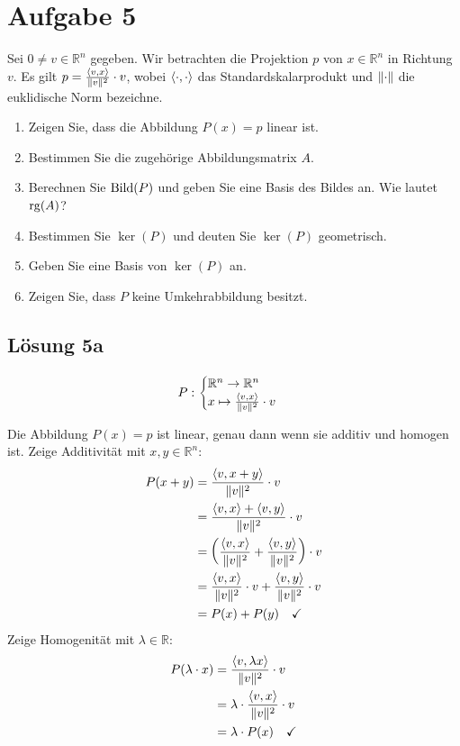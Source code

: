 \documentclass[main.tex]{subfiles}
\begin{document}
\section{Aufgabe 5}
Sei $0 \neq v \in \mathbb{R}^n$ gegeben. Wir betrachten die Projektion $p$ von $x\in \mathbb{R}^n$ in Richtung $v$. Es gilt $p=\frac{\langle v,x\rangle}{\lVert v\rVert^2} \cdot v$, wobei $\langle\cdot, \cdot\rangle$ das Standardskalarprodukt und $\lVert\cdot\rVert$ die euklidische Norm bezeichne.

\begin{enumerate}
    \item Zeigen Sie, dass die Abbildung $P(x)=p$ linear ist.
    \item Bestimmen Sie die zugehörige Abbildungsmatrix $A$.
    \item Berechnen Sie $\operatorname{Bild}(P)$ und geben Sie eine Basis des Bildes an. Wie lautet $\operatorname{rg}(A)$?
    \item Bestimmen Sie $\ker(P)$ und deuten Sie $\ker(P)$ geometrisch.
    \item Geben Sie eine Basis von $\ker(P)$ an.
    \item Zeigen Sie, dass $P$ keine Umkehrabbildung besitzt.
\end{enumerate}

\subsection{Lösung 5a}
$$
    P: \begin{cases}
        \mathbb{R}^n \to \mathbb{R}^n \\
        x \mapsto \frac{\langle v,x\rangle}{\lVert v\rVert^2} \cdot v\\
    \end{cases}
$$

Die Abbildung $P(x)=p$ ist linear, genau dann wenn sie additiv und homogen ist.
Zeige Additivität mit $x,y\in \mathbb{R}^n$:
\begin{align*}
    P(x+y) &= \frac{\langle v,x+y\rangle}{\lVert v\rVert^2} \cdot v \\
    &= \frac{\langle v,x\rangle+\langle v,y\rangle}{\lVert v\rVert^2} \cdot v \\
    &= \left(
        \frac{\langle v,x\rangle}{\lVert v\rVert^2} + \frac{\langle v,y\rangle}{\lVert v\rVert^2}
    \right) \cdot v \\
    &= \frac{\langle v,x\rangle}{\lVert v\rVert^2}\cdot v + \frac{\langle v,y\rangle}{\lVert v\rVert^2}\cdot v \\
    &= P(x) + P(y) \quad \checkmark
\end{align*}
Zeige Homogenität mit $\lambda \in \mathbb{R}$:
\begin{align*}
    P(\lambda \cdot x) &= \frac{\langle v,\lambda x\rangle}{\lVert v\rVert^2} \cdot v \\
                 &= \lambda \cdot \frac{\langle v,x\rangle}{\lVert v\rVert^2} \cdot v \\
                 &= \lambda \cdot P(x)  \quad \checkmark
\end{align*}
\end{document}
